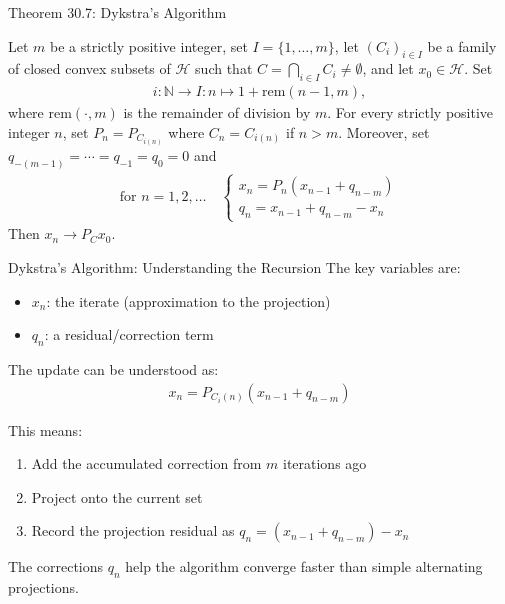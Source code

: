 \documentclass[aspectratio=169,10pt]{beamer}
\begin{document}

\begin{frame}{Theorem 30.7: Dykstra's Algorithm}
  \begin{theorem}
    Let $m$ be a strictly positive integer, set $I = \{1, \ldots, m\}$, let $(C_i)_{i \in I}$ be a family of closed convex subsets of $\mathcal{H}$ such that $C = \bigcap_{i \in I} C_i \neq \emptyset$, and let $x_0 \in \mathcal{H}$. Set
    \begin{align}
      i: \mathbb{N} \to I: n \mapsto 1 + \text{rem}(n-1, m),
    \end{align}
    where $\text{rem}(\cdot, m)$ is the remainder of division by $m$. For every strictly positive integer $n$, set $P_n = P_{C_{i(n)}}$ where $C_n = C_{i(n)}$ if $n > m$. Moreover, set $q_{-(m-1)} = \cdots = q_{-1} = q_0 = 0$ and
    \begin{align}
      \text{for } n = 1, 2, \ldots \quad
      \begin{cases}
        x_n = P_n(x_{n-1} + q_{n-m}) \\
        q_n = x_{n-1} + q_{n-m} - x_n
      \end{cases}
    \end{align}
    Then $x_n \to P_C x_0$.
  \end{theorem}
\end{frame}


\begin{frame}{Dykstra's Algorithm: Understanding the Recursion}
  The key variables are:
  \begin{itemize}
    \item $x_n$: the iterate (approximation to the projection)
    \item $q_n$: a residual/correction term
  \end{itemize}

  \vspace{0.3cm}

  The update can be understood as:
  \begin{align}
    x_n = P_{C_i(n)}(x_{n-1} + q_{n-m})
  \end{align}

  This means:
  \begin{enumerate}
    \item Add the accumulated correction from $m$ iterations ago
    \item Project onto the current set
    \item Record the projection residual as $q_n = (x_{n-1} + q_{n-m}) - x_n$
  \end{enumerate}

  \vspace{0.3cm}

  The corrections $q_n$ help the algorithm converge faster than simple alternating projections.
\end{frame}
\end{document}
